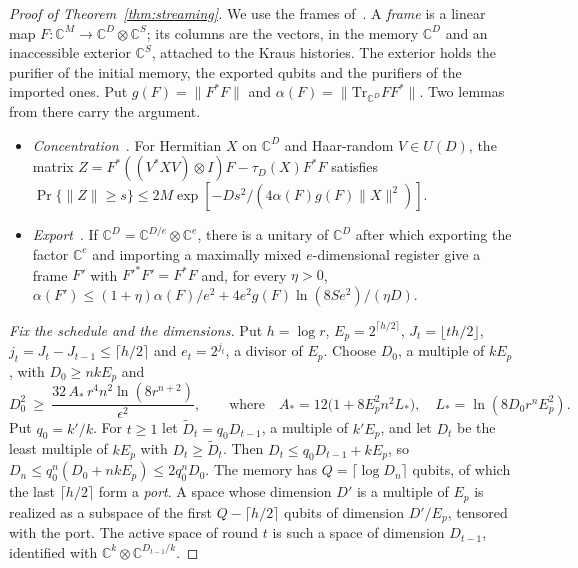 \begin{proof}[Proof of Theorem~\ref{thm:streaming}]
We use the frames of~\cite[Appendix~A]{DouglasMghirbiB}. A \emph{frame} is a linear map $F:\mathbb C^M\to\mathbb C^D\otimes\mathbb C^S$; its columns
are the vectors, in the memory $\mathbb C^D$ and an inaccessible exterior $\mathbb C^S$, attached to the Kraus histories. The exterior holds the
purifier of the initial memory, the exported qubits and the purifiers of the imported ones. Put $g(F)=\|F^*F\|$ and
$\alpha(F)=\|\mathrm{Tr}_{\mathbb C^D}FF^*\|$. Two lemmas from there carry the argument.
\begin{itemize}[leftmargin=1.2em,itemsep=1pt]
\item \emph{Concentration}~\cite[Lemma~A.1]{DouglasMghirbiB}. For Hermitian $X$ on $\mathbb C^D$ and Haar-random $V\in U(D)$, the matrix
$Z=F^*((V^*XV)\otimes I)F-\tau_D(X)F^*F$ satisfies $\Pr\{\|Z\|\ge s\}\le2M\exp[-Ds^2/(4\alpha(F)g(F)\|X\|^2)]$.
\item \emph{Export}~\cite[Lemma~A.4]{DouglasMghirbiB}. If $\mathbb C^D=\mathbb C^{D/e}\otimes\mathbb C^e$, there is a unitary of $\mathbb C^D$ after
which exporting the factor $\mathbb C^e$ and importing a maximally mixed $e$-dimensional register give a frame $F'$ with $F'^*F'=F^*F$ and, for every
$\eta>0$, $\alpha(F')\le(1+\eta)\alpha(F)/e^2+4e^2g(F)\ln(8Se^2)/(\eta D)$.
\end{itemize}

\emph{Fix the schedule and the dimensions.} Put $h=\log r$, $E_p=2^{\lceil h/2\rceil}$, $J_t=\lfloor th/2\rfloor$, $j_t=J_t-J_{t-1}\le\lceil h/2\rceil$ and
$e_t=2^{j_t}$, a divisor of $E_p$. Choose $D_0$, a multiple of $kE_p$, with $D_0\ge nkE_p$ and
\begin{equation}\label{eq:D0}
D_0^2\ \ge\ \frac{32\,A_*\,r^4n^2\ln(8r^{n+2})}{\epsilon^2},\qquad\text{where}\quad A_*=12\bigl(1+8E_p^2n^2L_*\bigr),\quad L_*=\ln(8D_0r^nE_p^2).
\end{equation}
Put $q_0=k'/k$. For $t\ge1$ let $\widetilde D_t=q_0D_{t-1}$, a multiple of $k'E_p$, and let $D_t$ be the least multiple of $kE_p$ with
$D_t\ge\widetilde D_t$. Then $D_t\le q_0D_{t-1}+kE_p$, so $D_n\le q_0^n(D_0+nkE_p)\le2q_0^nD_0$. The memory has $Q=\lceil\log D_n\rceil$ qubits, of
which the last $\lceil h/2\rceil$ form a \emph{port}. A space whose dimension $D'$ is a multiple of $E_p$ is realized as a subspace of the first
$Q-\lceil h/2\rceil$ qubits of dimension $D'/E_p$, tensored with the port. The active space of round $t$ is such a space of dimension $D_{t-1}$,
identified with $\mathbb C^k\otimes\mathbb C^{D_{t-1}/k}$.


\end{proof}

